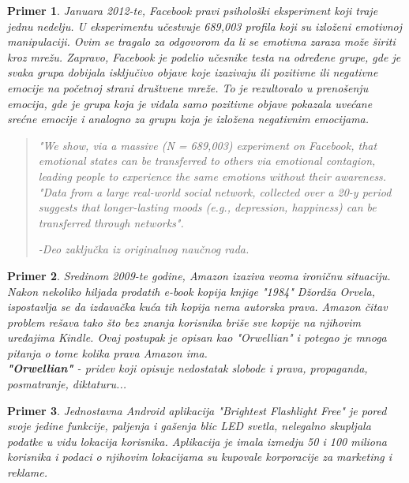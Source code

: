 \documentclass[a4paper]{article}
\newtheorem{primer}{Primer}[section]
\begin{document}
\begin{primer}
	Januara 2012-te, Facebook pravi psihološki eksperiment koji 
traje jednu nedelju. U eksperimentu učestvuje 689,003 profila koji su izloženi emotivnoj manipulaciji. Ovim se tragalo za odgovorom da li se emotivna zaraza može širiti kroz mrežu. Zapravo, Facebook je podelio učesnike testa na određene grupe, gde je svaka grupa dobijala isključivo objave koje izazivaju ili pozitivne ili negativne emocije na početnoj strani društvene mreže. To je rezultovalo u prenošenju emocija, gde je grupa koja je viđala samo pozitivne objave pokazala uvećane srećne emocije i analogno 	za grupu koja je izložena negativnim emocijama. \cite{facebookExperiment}
\begin{quotation}
	\textit{"We show, via a massive (N = 689,003) experiment on Facebook, that emotional states can be transferred to others via emotional contagion, leading people to experience the same emotions without their awareness.
"Data from a large real-world social network, collected over a 20-y period suggests that longer-lasting moods (e.g., depression, happiness) can be transferred through networks".}
\begin{flushright}
-\em{Deo zaključka iz originalnog naučnog rada.} \cite{facebookExperiment}
\end{flushright}
\end{quotation}
\end{primer}

\begin{primer}
	Sredinom 2009-te godine, Amazon izaziva veoma ironičnu 
situaciju. Nakon nekoliko hiljada prodatih e-book kopija knjige "1984" Džordža Orvela, ispostavlja se da izdavačka kuća tih kopija nema autorska prava. Amazon čitav problem rešava tako što bez znanja korisnika briše sve kopije na njihovim uređajima Kindle. Ovaj postupak je opisan kao "Orwellian" i potegao je mnoga pitanja o tome kolika prava Amazon ima. \cite{dataAndGoliath} \\
\textbf{"Orwellian"} - \textit{pridev koji opisuje nedostatak slobode i prava, propaganda, posmatranje, diktaturu...}\\
\end{primer}

\begin{primer}
	Jednostavna Android aplikacija "Brightest Flashlight 
Free" je pored svoje jedine funkcije, paljenja i gašenja blic LED svetla, nelegalno skupljala podatke u vidu lokacija korisnika. Aplikacija je imala izmedju 50 i 100 miliona korisnika i podaci o njihovim lokacijama su kupovale korporacije za marketing i reklame.\cite{dataAndGoliath}\cite{flashlightApp}\\
\end{primer}
\end{document}
